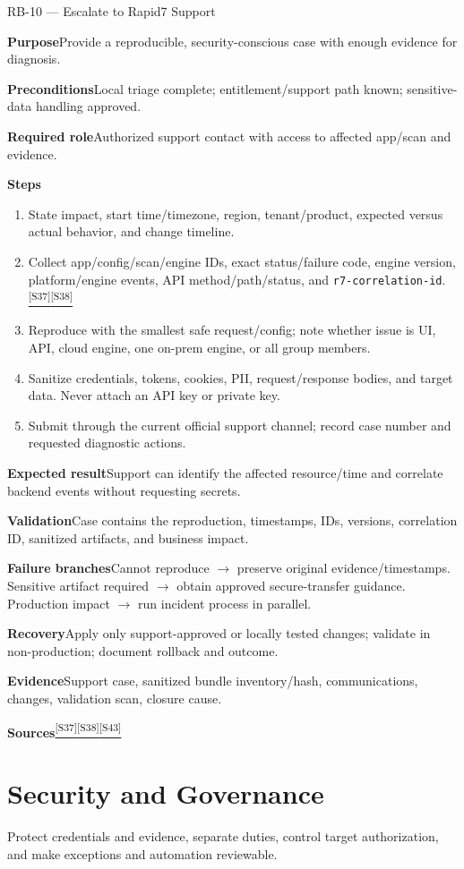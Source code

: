 \documentclass[11pt,letterpaper,oneside]{scrreprt}
\newcommand{\src}[1]{\hyperref[src:#1]{\textsuperscript{\color{R7Orange}[#1]}}}
\newcommand{\code}[1]{\texttt{#1}}
\newcommand{\field}[1]{\par\smallskip\noindent\textbf{#1}\quad}
\newcommand{\chapterlead}[1]{\begin{tcolorbox}[enhanced,colback=R7Light,colframe=R7Light,boxrule=0pt,borderline west={3pt}{0pt}{R7Orange},arc=0pt,left=9pt,right=9pt,top=7pt,bottom=7pt]#1\end{tcolorbox}}
\begin{document}
\begin{procedure}{RB-10 --- Escalate to Rapid7 Support}
\field{Purpose}Provide a reproducible, security-conscious case with enough evidence for diagnosis.
\field{Preconditions}Local triage complete; entitlement/support path known; sensitive-data handling approved.
\field{Required role}Authorized support contact with access to affected app/scan and evidence.
\field{Steps}
\begin{enumerate}
  \item State impact, start time/timezone, region, tenant/product, expected versus actual behavior, and change timeline.
  \item Collect app/config/scan/engine IDs, exact status/failure code, engine version, platform/engine events, API method/path/status, and \code{r7-correlation-id}.\src{S37}\src{S38}
  \item Reproduce with the smallest safe request/config; note whether issue is UI, API, cloud engine, one on-prem engine, or all group members.
  \item Sanitize credentials, tokens, cookies, PII, request/response bodies, and target data. Never attach an API key or private key.
  \item Submit through the current official support channel; record case number and requested diagnostic actions.
\end{enumerate}
\field{Expected result}Support can identify the affected resource/time and correlate backend events without requesting secrets.
\field{Validation}Case contains the reproduction, timestamps, IDs, versions, correlation ID, sanitized artifacts, and business impact.
\field{Failure branches}Cannot reproduce $\rightarrow$ preserve original evidence/timestamps. Sensitive artifact required $\rightarrow$ obtain approved secure-transfer guidance. Production impact $\rightarrow$ run incident process in parallel.
\field{Recovery}Apply only support-approved or locally tested changes; validate in non-production; document rollback and outcome.
\field{Evidence}Support case, sanitized bundle inventory/hash, communications, changes, validation scan, closure cause.
\field{Sources}\src{S37}\src{S38}\src{S43}
\end{procedure}

\chapter{Security and Governance}
\chapterlead{Protect credentials and evidence, separate duties, control target authorization, and make exceptions and automation reviewable.}
\end{document}
